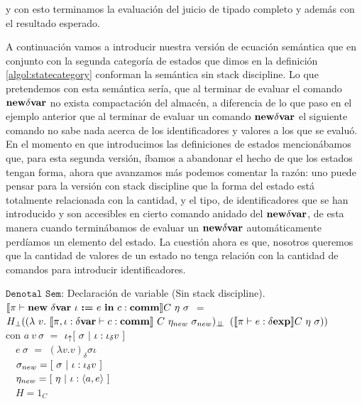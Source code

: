 \noindent
y con esto terminamos la evaluaci\'on del juicio de tipado completo y adem\'as con 
el resultado esperado.

A continuaci\'on vamos a introducir nuestra versi\'on de ecuaci\'on sem\'antica
que en conjunto con la segunda categor\'ia de estados que dimos en la definici\'on 
\ref{algol:statecategory} conforman la sem\'antica
sin stack discipline. Lo que pretendemos con esta sem\'antica ser\'ia, que al
terminar de evaluar el comando $\textbf{new} \delta \textbf{var}$ no exista compactaci\'on del
almac\'en, a diferencia de lo que paso en el ejemplo anterior que al terminar de evaluar
un comando $\textbf{new} \delta \textbf{var}$ el siguiente comando no sabe nada acerca de los
identificadores y valores a los que se evalu\'o.\\

En el momento en que introducimos las definiciones de estados mencion\'abamos 
que, para esta segunda versi\'on, \'ibamos a abandonar el hecho de que los estados tengan
forma, ahora que avanzamos m\'as podemos comentar la raz\'on: uno puede pensar para la
versi\'on con stack discipline que la forma del estado est\'a totalmente relacionada
con la cantidad, y el tipo, de identificadores que se han introducido y son accesibles
en cierto comando anidado del $\textbf{new} \delta \textbf{var}$, de esta manera cuando termin\'abamos 
de evaluar un $\textbf{new} \delta \textbf{var}$ autom\'aticamente perd\'iamos un elemento del estado.
La cuesti\'on ahora es que, nosotros queremos que la cantidad de valores de un
estado no tenga relaci\'on con la cantidad de comandos para introducir identificadores.\\

\newpage

\noindent
$\texttt{Denotal Sem:}$ Declaraci\'on de variable (Sin stack discipline).\\

$\llbracket \pi \vdash \textbf{new} \ \delta \textbf{var} \ \iota \ \textbf{:=} \ e \ \textbf{in} \ c : \textbf{comm} \rrbracket C \ \eta \ \sigma$ 
$=$ \\ \indent \indent
$H_{\bot} ((\lambda \ v . \ \semBrcks{\pi,\iota:\deltavar \vdash c : \commt}
		\ C \ \eta_{new} \ \sigma_{new})_{\dbot}$
$(\semBrcks{\pi \vdash e : \deltaexp}C \ \eta \ \sigma))$\\

con 
$a \ v \ \sigma$ $=$ $\iota_{\uparrow} [ \ \sigma \ | \ \iota:\iota_{\delta} v \ ] $\\
\indent \indent \ \
$e \ \sigma$ $=$ $(\lambda v . v)_{\delta}\sigma \iota$\\
\indent \indent \ \
$\sigma_{new} = [ \ \sigma \ | \ \iota:\iotadelta v \ ]$\\
\indent \indent \ \
$\eta_{new} = [ \ \eta \ | \ \iota:\lrangles{a,e} \ ]$\\
\indent \indent \ \
$H = 1_C$\\


